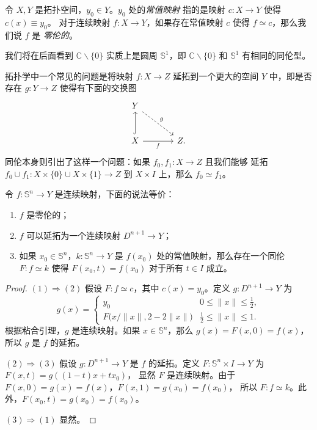 \documentclass[fontset=none]{Notes}
\newcommand{\norm}[1]{\lVert#1\rVert}
\begin{document}
\begin{definition}
  令 $X,Y$ 是拓扑空间，$y_0\in Y$。$y_0$ 处的\emph{常值映射}
  指的是映射 $c:X\to Y$ 使得 $c(x)\equiv y_0$。
  对于连续映射 $f:X\to Y$，如果存在常值映射 $c$ 使得 $f\simeq c$，那么我们说 $f$ 是
  \emph{零伦的}。
\end{definition}

\begin{remark}
  我们将在后面看到 $\mathbb{C}\smallsetminus\{0\}$ 实质上是圆周
  $\mathbb{S}^1$，即 $\mathbb{C}\smallsetminus\{0\}$ 和 $\mathbb{S}^1$
  有相同的同伦型。
\end{remark}

拓扑学中一个常见的问题是将映射 $f:X\to Z$ 延拓到一个更大的空间 $Y$
中，即是否存在 $g:Y\to Z$ 使得有下面的交换图
\[
  \begin{tikzcd}[column sep=large,row sep=large]
    Y\arrow[dr,"g",dashrightarrow] & \\
    X\arrow[u,hook]\arrow[r,"f"'] & Z  .
  \end{tikzcd}
\]
同伦本身则引出了这样一个问题：如果 $f_0,f_1:X\to Z$ 且我们能够
延拓 $f_0\cup f_1:X\times\{0\}\cup X\times\{1\}\to Z$ 到
$X\times I$ 上，那么 $f_0\simeq f_1$。

\begin{theorem}
  令 $f:\mathbb{S}^n\to Y$ 是连续映射，下面的说法等价：
  \begin{enumerate}
    \item $f$ 是零伦的；
    \item $f$ 可以延拓为一个连续映射 $D^{n+1}\to Y$；
    \item 如果 $x_0\in \mathbb{S}^n$，$k:\mathbb{S}^n\to Y$
    是 $f(x_0)$ 处的常值映射，那么存在一个同伦 $F:f\simeq k$
    使得 $F(x_0,t)=f(x_0)$ 对于所有 $t\in I$ 成立。
  \end{enumerate}
\end{theorem}
\begin{proof}
  $(1)\Rightarrow(2)$ 假设 $F:f\simeq c$，其中 $c(x)=y_0$。定义
  $g:D^{n+1}\to Y$ 为
  \[
    g(x)=\begin{cases}
      y_0 & 0\leq \norm{x}\leq\frac{1}{2},\\
      F\bigl(x/\norm{x},2-2\norm{x}\bigr) & 
      \frac{1}{2}\leq\norm{x}\leq 1.
    \end{cases}
  \]
  根据粘合引理，$g$ 是连续映射。如果 $x\in \mathbb{S}^n$，那么
  $g(x)=F(x,0)=f(x)$，所以 $g$ 是 $f$ 的延拓。

  $(2)\Rightarrow(3)$ 假设 $g:D^{n+1}\to Y$ 是 $f$ 的延拓。定义
  $F:\mathbb{S}^{n}\times I\to Y$ 为 $F(x,t)=g((1-t)x+tx_0)$，
  显然 $F$ 是连续映射。由于 $F(x,0)=g(x)=f(x)$，$F(x,1)=g(x_0)=f(x_0)$，
  所以 $F:f\simeq k$。此外，$F(x_0,t)=g(x_0)=f(x_0)$。

  $(3)\Rightarrow (1)$ 显然。
\end{proof}
\end{document}
